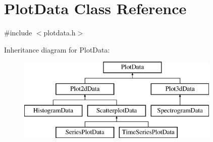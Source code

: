 \hypertarget{class_plot_data}{\section{\-Plot\-Data \-Class \-Reference}
\label{class_plot_data}
}


{\ttfamily \#include $<$plotdata.\-h$>$}

\-Inheritance diagram for \-Plot\-Data\-:\begin{figure}[H]
\begin{center}
\leavevmode
\includegraphics[height=4.000000cm]{class_plot_data}
\end{center}
\end{figure}
